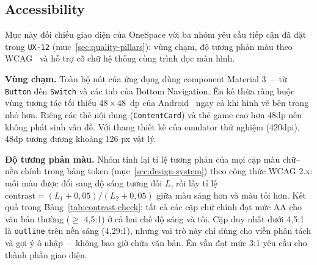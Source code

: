 \subsection{Accessibility}
\label{sec:accessibility}

Mục này đối chiếu giao diện của OneSpace với ba nhóm yêu cầu tiếp cận đã đặt trong \texttt{UX-12} (mục~\ref{sec:quality-pillars}): vùng chạm, độ tương phản màu theo WCAG~\cite{wcag22} và hỗ trợ cỡ chữ hệ thống cùng trình đọc màn hình.

\textbf{Vùng chạm.} Toàn bộ nút của ứng dụng dùng component Material 3~--~từ \texttt{Button} đến \texttt{Switch} và các tab của Bottom Navigation. Ên kế thừa ràng buộc vùng tương tác tối thiểu $48 \times 48$~dp của Android~\cite{android-accessibility} ngay cả khi hình vẽ bên trong nhỏ hơn. Riêng các thẻ nội dung (\texttt{ContentCard}) và thẻ game cao hơn 48dp nên không phát sinh vấn đề. Với thang thiết kế của emulator thử nghiệm (420dpi), 48dp tương đương khoảng 126 px vật lý.

\textbf{Độ tương phản màu.} Nhóm tính lại tỉ lệ tương phản của mọi cặp màu chữ--nền chính trong bảng token (mục~\ref{sec:design-system}) theo công thức WCAG 2.x: mỗi màu được đổi sang độ sáng tương đối $L$, rồi lấy tỉ lệ $\text{contrast} = (L_1 + 0{,}05)/(L_2 + 0{,}05)$ giữa màu sáng hơn và màu tối hơn. Kết quả trong Bảng~\ref{tab:contrast-check}: tất cả các cặp chữ chính đạt mức AA cho văn bản thường ($\geq$ 4,5:1) ở cả hai chế độ sáng và tối. Cặp duy nhất dưới 4,5:1 là \texttt{outline} trên nền sáng (4,29:1), nhưng vai trò này chỉ dùng cho viền phân tách và gợi ý ô nhập~--~không bao giờ chứa văn bản. Ên vẫn đạt mức 3:1 yêu cầu cho thành phần giao diện.

